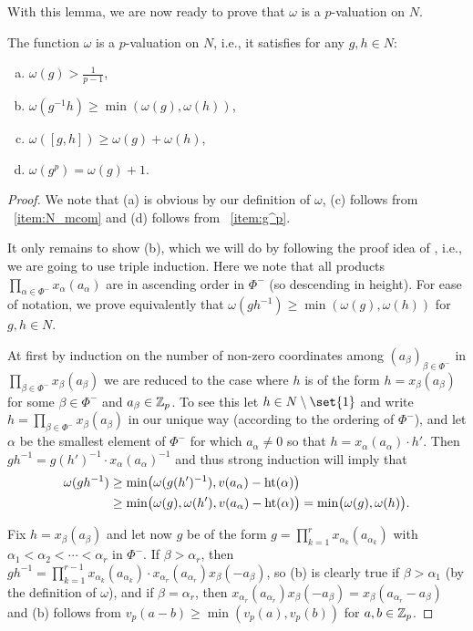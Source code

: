With this lemma, we are now ready to prove that $\omega$ is a $p$-valuation on $N$.

\begin{proposition}
  The function $\omega$ is a $p$-valuation on $N$, i.e., it satisfies for any $g,h \in N$:
  \begin{enumerate}[(a)]
  \item $\omega(g) > \frac{1}{p-1}$,
  \item $\omega(g^{-1}h) \geq \min(\omega(g),\omega(h))$,
  \item $\omega([g,h]) \geq \omega(g) + \omega(h)$,
  \item $\omega(g^p) = \omega(g) + 1$.
  \end{enumerate}
\end{proposition}
\begin{proof}
  We note that (a) is obvious by our definition of $\omega$, (c) follows from ~\ref{item:N_mcom} and (d) follows from ~\ref{item:g^p}.

  It only remains to show (b), which we will do by following the proof idea of \cite[Lem.~1]{Zab}, i.e., we are going to use triple induction. Here we note that all products $\prod_{\alpha \in \Phi^{-}} x_\alpha(a_\alpha)$ are in ascending order in $\Phi^{-}$ (so descending in height). For ease of notation, we prove equivalently that $\omega(gh^{-1}) \geq \min(\omega(g),\omega(h))$ for $g,h \in N$.

  At first by induction on the number of non-zero coordinates among $(a_{\beta})_{\beta \in \Phi^{-}}$ in $\prod_{\beta \in \Phi^{-}} x_{\beta}(a_{\beta})$ we are reduced to the case where $h$ is of the form $h = x_{\beta}(a_{\beta})$ for some $\beta \in \Phi^{-}$ and $a_{\beta} \in \mathbb{Z}_p$. To see this let $h \in N \setminus \set{1}$ and write $h = \prod_{\beta \in \Phi^{-}} x_{\beta}(a_{\beta})$ in our unique way (according to the ordering of $\Phi^{-}$), and let $\alpha$ be the smallest element of $\Phi^{-}$ for which $a_{\alpha} \neq 0$ so that $h = x_{\alpha}(a_{\alpha}) \cdot h'$. Then $gh^{-1} = g(h')^{-1} \cdot x_{\alpha}(a_{\alpha})^{-1}$ and thus strong induction will imply that
\begin{align*}
  \omega(gh^{-1}) &\geq \min\bigl( \omega(g(h')^{-1}), v(a_{\alpha})-\operatorname{ht}(\alpha)\bigr) \\
  &\geq \min\bigl( \omega(g),\omega(h'), v(a_{\alpha})-\operatorname{ht}(\alpha) \bigr) = \min\bigl( \omega(g),\omega(h) \bigr).
\end{align*}

Fix $h = x_{\beta}(a_{\beta})$ and let now $g$ be of the form $g = \prod_{k=1}^r x_{\alpha_k}(a_{\alpha_k})$ with $\alpha_1 < \alpha_2 < \dotsb < \alpha_r$ in $\Phi^{-}$. If $\beta > \alpha_{r}$, then $gh^{-1} = \prod_{k=1}^{r-1} x_{\alpha_k}(a_{\alpha_k}) \cdot x_{\alpha_{r}}(a_{\alpha_{r}}) x_{\beta}(-a_{\beta})$, so (b) is clearly true if $\beta > \alpha_1$ (by the definition of $\omega$), and if $\beta = \alpha_{r}$, then $x_{\alpha_{r}}(a_{\alpha_{r}})x_{\beta}(-a_{\beta}) = x_{\beta}(a_{\alpha_{r}} - a_{\beta})$ and (b) follows from $v_p(a-b) \geq \min(v_p(a),v_p(b))$ for $a,b \in \mathbb{Z}_p$.


\end{proof}
